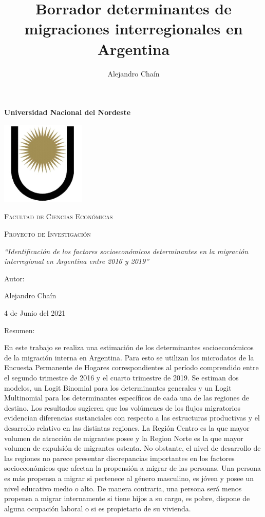 \documentclass[12pt,a4paper]{article}
\author{Alejandro Chaín}
\title{Borrador determinantes de migraciones interregionales en Argentina}
\begin{document}
\begin{titlepage}
\centering
\vspace{3cm}
{\bfseries\LARGE Universidad Nacional del Nordeste\par}
\vspace{1cm}
{\includegraphics[width=0.3\textwidth]{logounne.png}\par}
{\scshape\Large Facultad de Ciencias Econ\'omicas\par}
\vspace{2cm}
{\scshape\Huge Proyecto de Investigación \par}
\vspace{2cm}
{\itshape\Large ``Identificación de los factores socioeconómicos determinantes en la migración
interregional en Argentina entre 2016 y 2019'' \par}
\vfill
{\Large Autor: \par}
{\Large Alejandro Chaín\par}
\vfill
{\Large 4 de Junio del 2021 \par}
\end{titlepage}

\newpage
\begin{center}
Resumen:
\end{center}
En este trabajo se realiza una estimación de los determinantes socioeconómicos de la migración interna en Argentina. Para esto se utilizan los microdatos de
la Encuesta Permanente de Hogares correspondientes al período comprendido entre el segundo trimestre de 2016 y el cuarto trimestre de 2019. Se estiman dos modelos, un Logit Binomial para los determinantes generales y un Logit Multinomial para los determinantes específicos de cada una de las regiones de destino. Los resultados sugieren que los volúmenes de los flujos migratorios evidencian diferencias sustanciales con respecto a las estructuras productivas y el desarrollo relativo en las distintas regiones. La Región Centro es la que mayor volumen de atracción de migrantes posee y la Region Norte es la que mayor volumen de expulsión de migrantes ostenta. No obstante, el nivel de desarrollo de las regiones no parece presentar discrepancias importantes en los factores socioeconómicos que afectan la propensión a migrar de las personas. Una persona es más propensa a migrar si  pertenece al género masculino, es jóven y posee un nivel educativo medio o alto. De manera contraria, una persona será menos propensa a migrar internamente si tiene hijos a su cargo,  es pobre, dispone de alguna ocupación laboral o si es propietario de su vivienda. 
\newpage
\tableofcontents
\newpage
\end{document}

